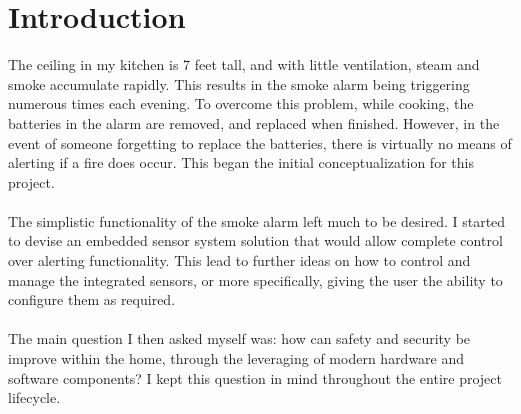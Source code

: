 \documentclass{article}
\begin{document}
\section{Introduction}
The ceiling in my kitchen is 7 feet tall, and with little ventilation, steam and smoke accumulate rapidly. This results in the smoke alarm being triggering numerous times each evening. To overcome this problem, while cooking, the batteries in the alarm are removed, and replaced when finished. However, in the event of someone forgetting to replace the batteries, there is virtually no means of alerting if a fire does occur. This began the initial conceptualization for this project. \\\\
The simplistic functionality of the smoke alarm left much to be desired. I started to devise an embedded sensor system solution that would allow complete control over alerting functionality. This lead to further ideas on how to control and manage the integrated sensors, or more specifically, giving the user the ability to configure them as required. \\\\
The main question I then asked myself was: how can safety and security be improve within the home, through the leveraging of modern hardware and software components? I kept this question in mind throughout the entire project lifecycle.
\end{document}
